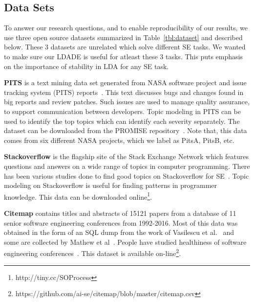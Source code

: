 \documentclass[twocolumn,5p,sort&compress]{elsarticle}
\theoremstyle{break}
\begin{document}
\subsection{Data Sets}
To answer our research questions, and to enable reproducibility of our results,
we use three open source datasets summarized in Table~\ref{tbl:dataset} and described
below. These 3 datasets are unrelated which solve different SE tasks. We wanted to make sure our LDADE is useful for atleast these 3 tasks. This puts emphasis on the importance of stability in LDA for any SE task. 

\textbf{PITS} is a text mining data set generated from NASA software project
and issue tracking system (PITS) reports~\cite{menzies2008improving, menzies2008automated}. This text discusses
bugs and changes found in big reports and  review patches.
Such issues are used
to manage quality assurance, to support communication
between developers. Topic modeling in PITS can be used
to identify the top topics which can
identify each severity separately. The dataset can be downloaded from the
PROMISE
repository~\cite{promiserepo}. Note that, this data comes from six different
NASA projects, which we label as PitsA, PitsB, etc.
    
 \textbf{Stackoverflow} is the flagship site of the Stack Exchange Network which
 features questions and answers on a wide range of topics in computer
 programming. There has been various studies done to find good topics on Stackoverflow for SE~\cite{barua2014developers,linares2013exploratory, allamanis2013and,rosen2016mobile}.
Topic modeling on Stackoverflow is useful for finding patterns in programmer knowledge.
 This data can be downloaded online\footnote{http://tiny.cc/SOProcess}. 
    
  \textbf{Citemap} contains titles and abstracts of 15121 papers from a
 database of 11 senior software engineering conferences from 1992-2016. Most of this data was
 obtained in the form of an SQL dump from the work of Vasilescu et
 al.~\cite{vasilescu2013historical} and some are collected by Mathew et al~\cite{mathew2016trends}. People have studied healthiness of software engineering conferences~\cite{vasilescu2014healthy}. This dataset is available on-line\footnote{https://github.com/ai-se/citemap/blob/master/citemap.csv}.
\end{document}
